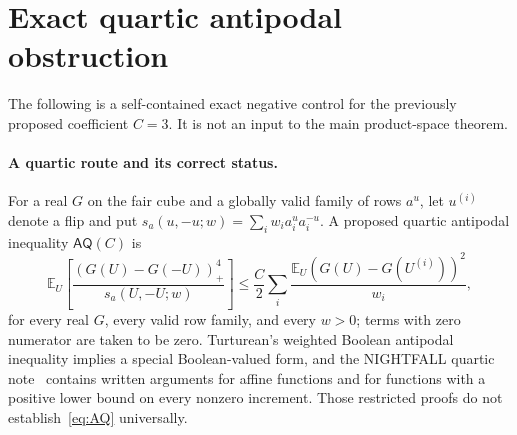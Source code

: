 \documentclass[11pt]{article}
\numberwithin{equation}{section}
\theoremstyle{remark}
\newcommand{\E}{\mathbb E}
\newcommand{\pos}[1]{(#1)_{+}}
\begin{document}
\section{Exact quartic antipodal obstruction}\label{app:quartic}
The following is a self-contained exact negative control for the
previously proposed coefficient $C=3$. It is not an input to the main
product-space theorem.
\paragraph{A quartic route and its correct status.}
For a real $G$ on the fair cube and a globally valid family of rows $a^u$, let $u^{(i)}$ denote a flip and put
$s_a(u,-u;w)=\sum_iw_i a_i^ua_i^{-u}$. A proposed quartic antipodal inequality $\mathsf{AQ}(C)$ is
\begin{equation}\label{eq:AQ}
 \E_U\left[\frac{\pos{G(U)-G(-U)}^4}{s_a(U,-U;w)}\right]
 \le\frac C2\sum_i\frac{\E_U(G(U)-G(U^{(i)}))^2}{w_i},
\end{equation}
for every real $G$, every valid row family, and every $w>0$; terms with zero numerator are taken to be zero. Turturean's weighted Boolean antipodal inequality implies a special Boolean-valued form, and the NIGHTFALL quartic note~\cite{WriQuartic} contains written arguments for affine functions and for functions with a positive lower bound on every nonzero increment. Those restricted proofs do not establish~\eqref{eq:AQ} universally.
\end{document}
